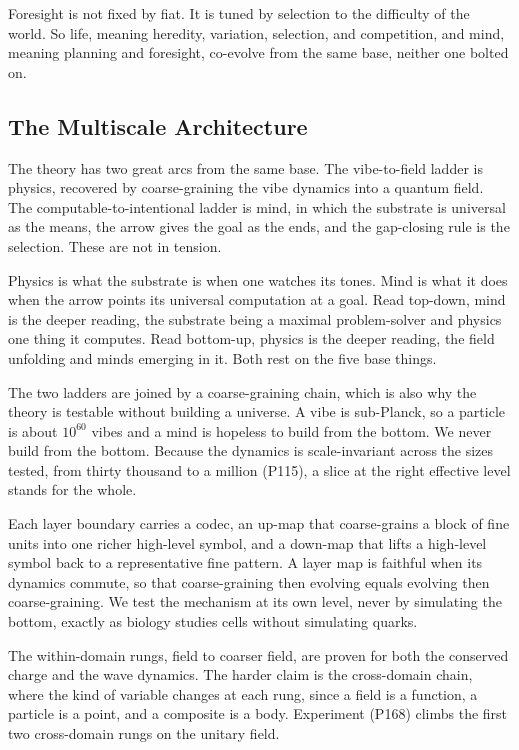 Foresight is not fixed by fiat. It is tuned by selection to the difficulty of the world. So life, meaning heredity, variation, selection, and competition, and mind, meaning planning and foresight, co-evolve from the same base, neither one bolted on.

\subsection{The Multiscale Architecture}

The theory has two great arcs from the same base. The vibe-to-field ladder is physics, recovered by coarse-graining the vibe dynamics into a quantum field. The computable-to-intentional ladder is mind, in which the substrate is universal as the means, the arrow gives the goal as the ends, and the gap-closing rule is the selection. These are not in tension.

Physics is what the substrate is when one watches its tones. Mind is what it does when the arrow points its universal computation at a goal. Read top-down, mind is the deeper reading, the substrate being a maximal problem-solver and physics one thing it computes. Read bottom-up, physics is the deeper reading, the field unfolding and minds emerging in it. Both rest on the five base things.

The two ladders are joined by a coarse-graining chain, which is also why the theory is testable without building a universe. A vibe is sub-Planck, so a particle is about $10^{60}$ vibes and a mind is hopeless to build from the bottom. We never build from the bottom. Because the dynamics is scale-invariant across the sizes tested, from thirty thousand to a million (P115), a slice at the right effective level stands for the whole.

Each layer boundary carries a codec, an up-map that coarse-grains a block of fine units into one richer high-level symbol, and a down-map that lifts a high-level symbol back to a representative fine pattern. A layer map is faithful when its dynamics commute, so that coarse-graining then evolving equals evolving then coarse-graining. We test the mechanism at its own level, never by simulating the bottom, exactly as biology studies cells without simulating quarks.

The within-domain rungs, field to coarser field, are proven for both the conserved charge and the wave dynamics. The harder claim is the cross-domain chain, where the kind of variable changes at each rung, since a field is a function, a particle is a point, and a composite is a body. Experiment (P168) climbs the first two cross-domain rungs on the unitary field.

